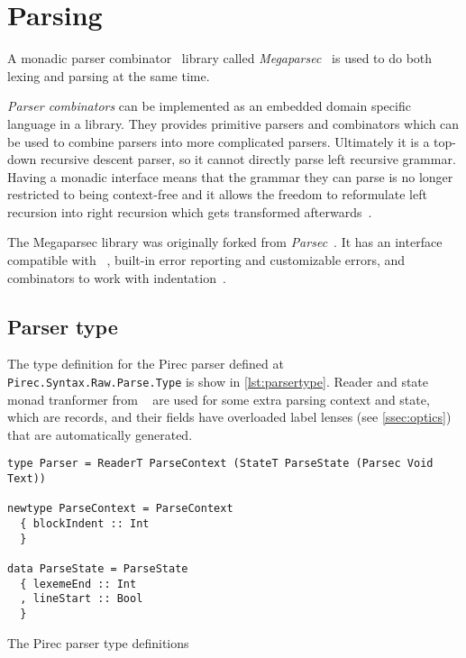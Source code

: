 \section{Parsing}\label{sec:parsing}

A monadic parser combinator~\cite{parsing-Hutton} library
called \emph{Megaparsec}~\cite{megaparsec} is used to do both lexing and parsing
at the same time.

\emph{Parser combinators} can be implemented as an embedded domain specific
language in a library. They provides primitive parsers and combinators which can
be used to combine parsers into more complicated parsers. Ultimately it is a
top-down recursive descent parser, so it cannot directly parse left recursive
grammar. Having a monadic interface means that the grammar they can parse is no
longer restricted to being context-free and it allows the freedom to reformulate
left recursion into right recursion which gets transformed
afterwards~\cite{parsing-Hutton, parsing-Swierstra}.

The Megaparsec library was originally forked from \emph{Parsec}~\cite{parsec}.
It has an interface compatible with ~\cite{mtl}, built-in error
reporting and customizable errors, and combinators to work with
indentation~\cite{megaparsec}.

\subsection{Parser type}\label{ssec:parser-type}

The type definition for the Pirec parser defined at
\texttt{Pirec.Syntax.Raw.Parse.Type} is show in \cref{lst:parsertype}. Reader
and state monad tranformer from ~\cite{mtl} are used for some extra
parsing context and state, which are records, and their fields have overloaded
label lenses (see \cref{ssec:optics}) that are automatically generated.

\begin{listing}
  \begin{verbatim}
type Parser = ReaderT ParseContext (StateT ParseState (Parsec Void Text))

newtype ParseContext = ParseContext
  { blockIndent :: Int
  }

data ParseState = ParseState
  { lexemeEnd :: Int
  , lineStart :: Bool
  }
  \end{verbatim}
  \caption{The Pirec parser type definitions}\label{lst:parsertype}
\end{listing}

